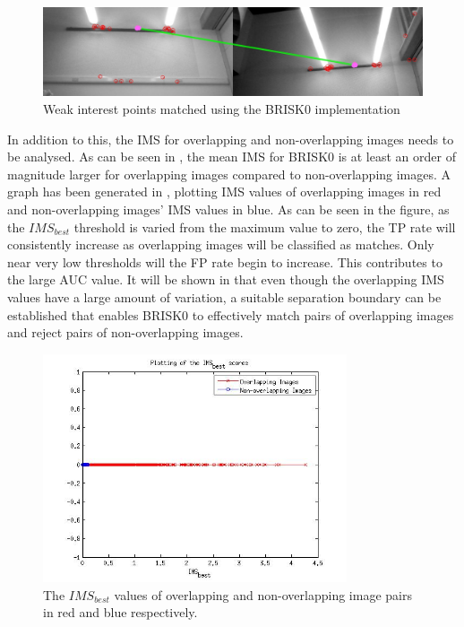 \documentclass[11pt]{report}
\begin{document}
 
\begin{figure}
  \centering
    \includegraphics[width=1.0\textwidth]{../Drawings/Matching/weakInterestPointMatch.jpg}
    \caption{Weak interest points matched using the BRISK0 implementation} 
    \label{fig:weakMatch}
\end{figure}

In addition to this, the IMS for overlapping and non-overlapping images needs to be analysed. As can be seen in , the mean IMS for BRISK0 is at least an order of magnitude larger for overlapping images compared to non-overlapping images. A graph has been generated in , plotting IMS values of overlapping images in red and non-overlapping images' IMS values in blue. As can be seen in the figure, as the $IMS_{best}$ threshold is varied from the maximum value to zero, the TP rate will consistently increase as overlapping images will be classified as matches. Only near very low thresholds will the FP rate begin to increase. This contributes to the large AUC value. It will be shown in  that even though the overlapping IMS values have a large amount of variation, a suitable separation boundary can be established that enables BRISK0 to effectively match pairs of overlapping images and reject pairs of non-overlapping images.\\

\begin{figure}
  \centering
    \includegraphics[width=0.8\textwidth]{../Drawings/Matching/MatchingScore_BRISK0.jpg}
    \caption{The $IMS_{best}$ values of overlapping and non-overlapping image pairs in red and blue respectively.} 
    \label{fig:ms_brisk0}
\end{figure}
\end{document}
